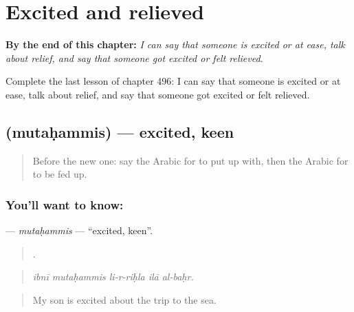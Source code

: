 
\chapter{Excited and relieved}
\label{ch:ar-excited-and-relieved}

\begin{chapteropening}
\textbf{By the end of this chapter:} \emph{I can say that someone is excited or at ease, talk about relief, and say that someone got excited or felt relieved.}

Complete the last lesson of chapter 496: I can say that someone is excited or at ease, talk about relief, and say that someone got excited or felt relieved.
\end{chapteropening}

\section[\texorpdfstring{\ar{متحمس} (mutaḥammis)}{متحمس (mutaḥammis)}]{ (mutaḥammis) — excited, keen}

\label{lesson:AR-C496-mutahammis}



\begin{quote}
Before the new one: say the Arabic for to put up with, then the Arabic for to be fed up.
\end{quote}

\subsection*{You'll want to know: }
\textbf{} — \emph{mutaḥammis} — \textquotedblleft{}excited, keen\textquotedblright{}.

\begin{quote}
    .
\end{quote}

\begin{quote}
\emph{ibnī mutaḥammis li-r-riḥla ilā al-baḥr.}
\end{quote}

\begin{quote}
My son is excited about the trip to the sea.
\end{quote}

